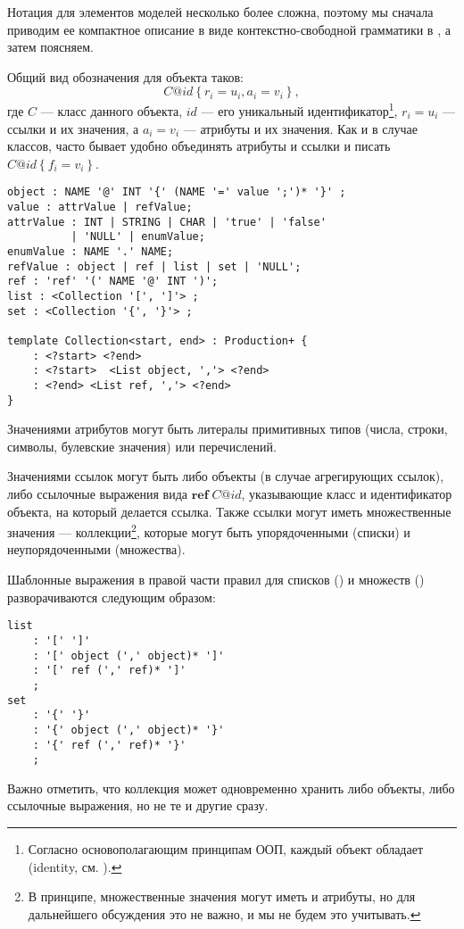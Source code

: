 \newcommand{\obj}[3]{#1@#2\left\{#3\right\}}%
\newcommand{\refv}[2]{\mathbf{ref}\; #1@#2}%
%
Нотация для элементов моделей несколько более сложна, поэтому мы сначала приводим ее компактное описание в виде контекстно-свободной грамматики в , а затем поясняем.

Общий вид обозначения для объекта таков: 
\[\obj{C}{id}{r_i = u_i, a_i = v_i},\]
 где $C$ --- класс данного объекта, $id$ --- его уникальный идентификатор\footnote{Согласно основополагающим принципам ООП, каждый объект обладает  (identity, см. \cite{Booch}).}, $r_i = u_i$ --- ссылки и их значения, а $a_i = v_i$ --- атрибуты и их значения. Как и в случае классов, часто бывает удобно объединять атрибуты и ссылки и писать $\obj{C}{id}{f_i = v_i}$.

\begin{lstlisting}[label=modelGrammar,float=htbp,caption={Грамматика, описывающая запись моделей в виде текста}]
object : NAME '@' INT '{' (NAME '=' value ';')* '}' ;
value : attrValue | refValue;
attrValue : INT | STRING | CHAR | 'true' | 'false' 
          | 'NULL' | enumValue;
enumValue : NAME '.' NAME;
refValue : object | ref | list | set | 'NULL';
ref	: 'ref' '(' NAME '@' INT ')';
list : <Collection '[', ']'> ;
set : <Collection '{', '}'> ;

template Collection<start, end> : Production+ {
	: <?start> <?end>
	: <?start>  <List object, ','> <?end>
	: <?end> <List ref, ','> <?end>
}
\end{lstlisting}

Значениями атрибутов могут быть литералы примитивных типов (числа, строки, символы, булевские значения) или перечислений.

Значениями ссылок могут быть либо объекты (в случае агрегирующих ссылок), либо ссылочные выражения вида $\refv{C}{id}$, указывающие класс и идентификатор объекта, на который делается ссылка. Также ссылки могут иметь множественные значения --- коллекции\footnote{В принципе, множественные значения могут иметь и атрибуты, но для дальнейшего обсуждения это не важно, и мы не будем это учитывать.}, которые могут быть упорядоченными (списки) и неупорядоченными (множества).

Шаблонные выражения в правой части правил для списков () и множеств () разворачиваются следующим образом:
\begin{lstlisting}
list
	: '[' ']'
	: '[' object (',' object)* ']'
	: '[' ref (',' ref)* ']'
	;
set
	: '{' '}'
	: '{' object (',' object)* '}'
	: '{' ref (',' ref)* '}'
	;
\end{lstlisting}
Важно отметить, что коллекция может одновременно хранить либо объекты, либо ссылочные выражения, но не те и другие сразу.

